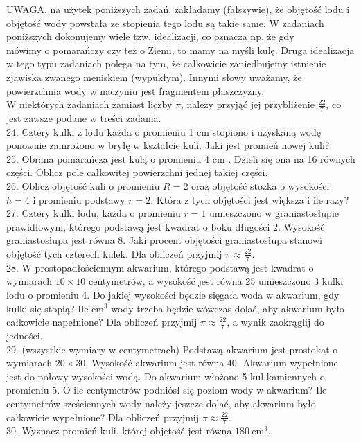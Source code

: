 \documentclass[10pt]{article}
\begin{document}
UWAGA, na użytek poniższych zadań, zakładamy (fałszywie), że objętość lodu i objętość wody powstała ze stopienia tego lodu są takie same. W zadaniach poniższych dokonujemy wiele tzw. idealizacji, co oznacza np, że gdy\\
mówimy o pomarańczy czy też o Ziemi, to mamy na myśli kulę. Druga idealizacja w tego typu zadaniach polega na tym, że całkowicie zaniedbujemy istnienie zjawiska zwanego meniskiem (wypukłym). Innymi słowy uważamy, że powierzchnia wody w naczyniu jest fragmentem płaszczyzny.\\
W niektórych zadaniach zamiast liczby \(\pi\), należy przyjąć jej przybliżenie \(\frac{22}{7}\), co jest zawsze podane w treści zadania.\\
24. Cztery kulki z lodu każda o promieniu 1 cm stopiono i uzyskaną wodę ponownie zamrożono w bryłę w kształcie kuli. Jaki jest promień nowej kuli?\\
25. Obrana pomarańcza jest kulą o promieniu 4 cm . Dzieli się ona na 16 równych części. Oblicz pole całkowitej powierzchni jednej takiej części.\\
26. Oblicz objętość kuli o promieniu \(R=2\) oraz objętość stożka o wysokości \(h=4\) i promieniu podstawy \(r=2\). Która z tych objętości jest większa i ile razy?\\
27. Cztery kulki lodu, każda o promieniu \(r=1\) umieszczono w graniastosłupie prawidłowym, którego podstawą jest kwadrat o boku długości 2. Wysokość graniastosłupa jest równa 8. Jaki procent objętości graniastosłupa stanowi objętość tych czterech kulek. Dla obliczeń przyjmij \(\pi \approx \frac{22}{7}\).\\
28. W prostopadłościennym akwarium, którego podstawą jest kwadrat o wymiarach \(10 \times 10\) centymetrów, a wysokość jest równa 25 umieszczono 3 kulki lodu o promieniu 4. Do jakiej wysokości będzie sięgała woda w akwarium, gdy kulki się stopią? Ile \(\mathrm{cm}^{3}\) wody trzeba będzie wówczas dolać, aby akwarium było całkowicie napełnione? Dla obliczeń przyjmij \(\pi \approx \frac{22}{7}\), a wynik zaokrąglij do jedności.\\
29. (wszystkie wymiary w centymetrach) Podstawą akwarium jest prostokąt o wymiarach \(20 \times 30\). Wysokość akwarium jest równa 40. Akwarium wypełnione jest do połowy wysokości wodą. Do akwarium włożono 5 kul kamiennych o promieniu 5. O ile centymetrów podniósł się poziom wody w akwarium? Ile centymetrów sześciennych wody należy jeszcze dolać, aby akwarium było całkowicie wypełnione? Dla obliczeń przyjmij \(\pi \approx \frac{22}{7}\).\\
30. Wyznacz promień kuli, której objętość jest równa \(180 \mathrm{~cm}^{3}\).
\end{document}
